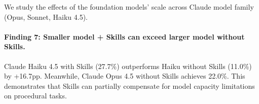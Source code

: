 We study the effects of the foundation models' scale across Claude model family (Opus, Sonnet, Haiku 4.5).
\vskip -1in
\paragraph{Finding 7: Smaller model + Skills can exceed larger model without Skills.} Claude Haiku 4.5 with Skills (27.7\%) outperforms Haiku without Skills (11.0\%) by +16.7pp. Meanwhile, Claude Opus 4.5 without Skills achieves 22.0\%. This demonstrates that Skills can partially compensate for model capacity limitations on procedural tasks.


